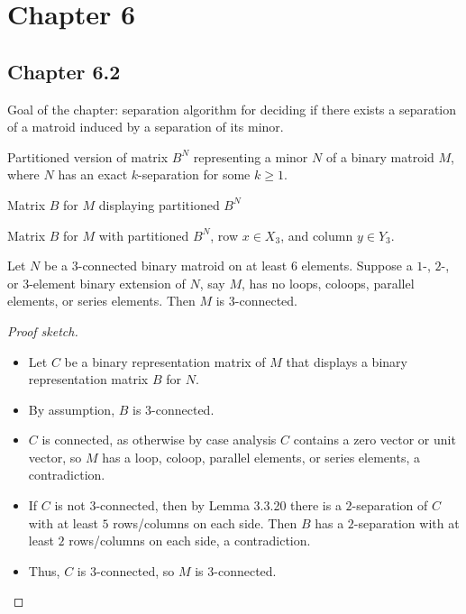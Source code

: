 \section{Chapter 6}

\subsection{Chapter 6.2}

Goal of the chapter: separation algorithm for deciding if there exists a separation of a matroid induced by a separation of its minor.

\begin{proposition}[6.2.1]
  \label{prop:6.2.1}
  Partitioned version of matrix $B^{N}$ representing a minor $N$ of a binary matroid $M$, where $N$ has an exact $k$-separation for some $k \geq 1$.
\end{proposition}

\begin{proposition}[6.2.3]
  \label{prop:6.2.3}
  Matrix $B$ for $M$ displaying partitioned $B^{N}$
\end{proposition}

\begin{proposition}[6.2.5]
  \label{prop:6.2.5}
  Matrix $B$ for $M$ with partitioned $B^{N}$, row $x \in X_{3}$, and column $y \in Y_{3}$.
\end{proposition}

\begin{lemma}[6.2.6]
  \label{lem:6.2.6}
  Let $N$ be a $3$-connected binary matroid on at least $6$ elements. Suppose a $1$-, $2$-, or $3$-element binary extension of $N$, say $M$, has no loops, coloops, parallel elements, or series elements. Then $M$ is $3$-connected.
\end{lemma}

\begin{proof}[Proof sketch]
  \begin{itemize}
    \item Let $C$ be a binary representation matrix of $M$ that displays a binary representation matrix $B$ for $N$.
    \item By assumption, $B$ is $3$-connected.
    \item $C$ is connected, as otherwise by case analysis $C$ contains a zero vector or unit vector, so $M$ has a loop, coloop, parallel elements, or series elements, a contradiction.
    \item If $C$ is not $3$-connected, then by Lemma 3.3.20 there is a $2$-separation of $C$ with at least $5$ rows/columns on each side. Then $B$ has a $2$-separation with at least $2$ rows/columns on each side, a contradiction.
    \item Thus, $C$ is $3$-connected, so $M$ is $3$-connected.
  \end{itemize}
\end{proof}


